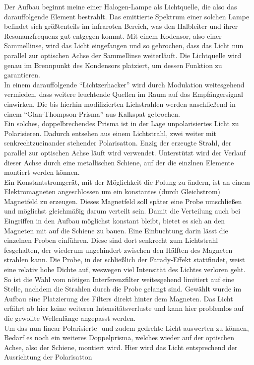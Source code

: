 Der Aufbau beginnt meine einer Halogen-Lampe als Lichtquelle, die also das darauffolgende Element bestrahlt. Das 
emittierte Spektrum einer solchen Lampe befindet sich größtenteils im infraroten Bereich, was den Halbleiter und ihrer 
Resonanzfrequenz gut entgegen kommt. Mit einem Kodensor, also einer Sammellinse, wird das Licht eingefangen und so gebrochen, 
dass das Licht nun parallel zur optischen Achse der Sammellinse weiterläuft. 
Die Lichtquelle wird genau im Brennpunkt des Kondensors platziert, um dessen Funktion zu garantieren.
\\
\newline
In einem darauffolgende \enquote{Lichtzerhacker} wird durch Modulation weitesgehend vermieden, dass weitere leuchtende Quellen im Raum
auf das Empfängersignal einwirken. Die bis hierhin modifizierten Lichstrahlen werden anschließend in einem
\enquote{Glan-Thompson-Prisma} aus Kalkspat gebrochen. \\
Ein solches, doppelbrechendes Prisma ist in der Lage unpolarisiertes Licht zu Polarisieren. Dadurch entsehen 
aus einem Lichtstrahl, zwei weiter mit senkrechtzueinander stehender Polarisatton. Enzig der erzeugte Strahl, 
der parallel zur optischen Achse läuft wird verwendet. Unterstützt wird der Verlauf dieser Achse durch eine metallischen Schiene,
auf der die einzlnen Elemente montiert werden können.
\\
\newline
Ein Konstantstromgerät, mit der Möglichkeit die Polung zu ändern, ist an einem Elektromagneten angeschlossen um ein konstantes (durch Gleichstrom) Magnetfeld
zu erzeugen. Dieses Magnetfeld soll später eine Probe umschließen und möglichst gleichmäßig darum verteilt sein. Damit die Verteilung 
auch bei Eingriffen in den Aufbau möglichst konstant bleibt, bietet es sich an den Magneten mit auf die Schiene zu bauen. Eine Einbuchtung 
darin lässt die einzelnen Proben einführen. Diese sind dort senkrecht zum Lichtstrahl fesgehalten, der wiederum ungehindert zwischen den Hälften des Magneten 
strahlen kann. Die Probe, in der schließlich der Farady-Effekt stattfindet, weist eine relativ hohe Dichte auf, weswegen viel Intensität des Lichtes verloren geht. 
So ist die Wahl vom nötigen Interferenzfilter weitesgehend limitiert auf eine Stelle, nachdem die Strahlen durch die Probe gelangt sind. 
Gewählt wurde im Aufbau eine Platzierung des Filters direkt hinter dem Magneten. Das Licht erfährt ab hier keine weiteren Intensitätsverluste und kann hier problemlos
auf die gewollte Wellenlänge angepasst werden.
\\
\newline
Um das nun linear Polarisierte -und zudem gedrehte Licht auswerten zu können, Bedarf es noch ein weiteres Doppelprisma, welches wieder auf der optischen Achse, also der Schiene,
montiert wird. Hier wird das Licht entsprechend der Ausrichtung der Polarisatton 

